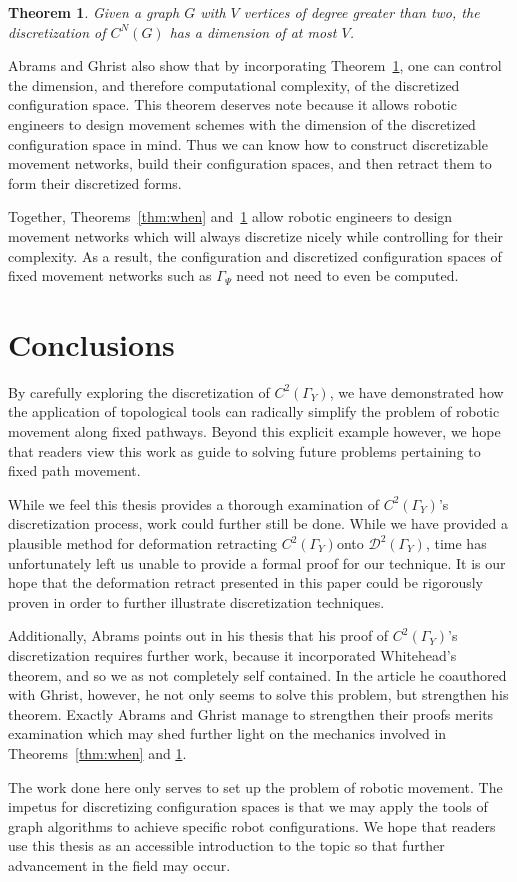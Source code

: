 \documentclass[12pt,oneside]{amsbook}
\newtheorem{thm}{Theorem}[chapter]
\newcommand{\Y}{\Gamma_Y}
\newcommand{\C}{$C^2(\Y)$}
\begin{document}
\begin{thm} \label{thm:dim}
Given a graph $G$ with $V$ vertices of degree greater than two, the discretization of $C^N(G)$ has a dimension of at most $V$.~\cite{factory}
\end{thm}

Abrams and Ghrist also show that by incorporating Theorem~\ref{thm:dim}, one can control the dimension, and therefore computational complexity, of the discretized configuration space\cite{factory}. This theorem deserves note because it allows robotic engineers to design movement schemes with the dimension of the discretized configuration space in mind. Thus we can know how to construct discretizable movement networks, build their configuration spaces, and then retract them to form their discretized forms.

Together, Theorems~\ref{thm:when} and~\ref{thm:dim} allow robotic engineers to design movement networks which will always discretize nicely while controlling for their complexity. As a result, the configuration and discretized configuration spaces of fixed movement networks such as $\Gamma_{\Psi}$ need not need to even be computed. 

\section{Conclusions}
By carefully exploring the discretization of \C, we have demonstrated how the application of topological tools can radically simplify the problem of robotic movement along fixed pathways. Beyond this explicit example however, we hope that readers view this work as guide to solving future problems pertaining to fixed path movement. 

While we feel this thesis provides a thorough examination of \C 's discretization process, work could further still be done. While we have provided a plausible method for deformation retracting \C onto $\mathcal{D}^2(\Y)$, time has unfortunately left us unable to provide a formal proof for our technique. It is our hope that the deformation retract presented in this paper could be rigorously proven in order to further illustrate discretization techniques. 

Additionally, Abrams points out in his thesis that his proof of \C 's discretization requires further work, because it incorporated Whitehead's theorem, and so we as not completely self contained\cite{thesis}. In the article he coauthored with Ghrist, however, he not only seems to solve this problem, but strengthen his theorem\cite{factory}. Exactly Abrams and Ghrist manage to strengthen their proofs merits examination which may shed further light on the mechanics involved in Theorems~\ref{thm:when} and \ref{thm:dim}.

The work done here only serves to set up the problem of robotic movement. The impetus for discretizing configuration spaces is that we may apply the tools of graph algorithms to achieve specific robot configurations. We hope that readers use this thesis as an accessible introduction to the topic so that further advancement in the field may occur.
\end{document}

